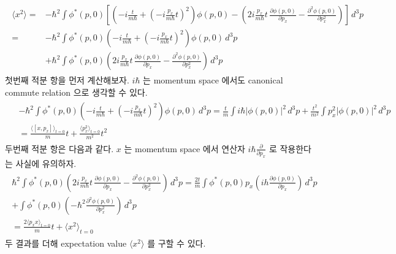 \documentclass[floatfix,nofootinbib,superscriptaddress,fleqn]{revtex4}
\begin{document}
\begin{itemize}
  \begin{align*}
    \begin{split}       
      \langle x^2 \rangle =& -\hbar^2\int\phi^*(p,0)
      \left[\left(-i\frac{t}{m\hbar}
      +\left(-i\frac{p_x}{m\hbar}t \right)^2\right)\phi(p,0)
      -\left(2i\frac{p_x}{m\hbar}t\,\frac{\partial \phi(p,0)}{\partial p_x}
      -\frac{\partial^2 \phi(p,0)}{\partial p_x^2}\right) \right]\,d^3p  \\
      =&-\hbar^2\int\phi^*(p,0)\left(-i\frac{t}{m\hbar}
      +\left(-i\frac{p_x}{m\hbar}t \right)^2\right)\phi(p,0)\,d^3p  \\
      &+\hbar^2\int\phi^*(p,0)\left(2i\frac{p_x}{m\hbar}t\,
      \frac{\partial\phi(p,0)}{\partial p_x}
      -\frac{\partial^2 \phi(p,0)}{\partial p_x^2}\right)\,d^3p 
    \end{split}
  \end{align*}
첫번째 적분 항을 먼저 계산해보자. $i\hbar$ 는 momentum space 
에서도 canonical commute relation 으로 생각할 수 있다.
  \begin{align*}
    \begin{split}
      &-\hbar^2\int\phi^*(p,0)\left(-i\frac{t}{m\hbar}
      +\left(-i\frac{p_x}{m\hbar}t \right)^2\right)\phi(p,0)\,d^3p 
      =\frac{t}{m}\int i\hbar|\phi(p,0)|^2\,d^3p+\frac{t^2}{m^2}
      \int p_x^2|\phi(p,0)|^2\,d^3p \\
      &=\frac{\langle[x,p_x]\rangle_{t=0}}{m}t
      +\frac{\langle p_x^2\rangle_{t=0}}{m^2}t^2
    \end{split}
  \end{align*}
두번째 적분 항은 다음과 같다. 
$x$ 는 momentum space 에서 연산자 $i\hbar\frac{\partial}{\partial p_x}$ 
로 작용한다는 사실에 유의하자.
  \begin{align*}
    \begin{split}
      \hbar^2\int\phi^*(p,0)\left(2i\frac{p_x}{m\hbar}t\,
      \frac{\partial \phi(p,0)}{\partial p_x}
      -\frac{\partial^2 \phi(p,0)}{\partial p_x^2}\right)\,d^3p 
      =\frac{2t}{m}\int\phi^*(p,0)p_x
      \left(ih\frac{\partial\phi(p,0)}{\partial p_x}\right)\,d^3p  \\
      +\int\phi^*(p,0)\left(
        -\hbar^2\frac{\partial^2\phi(p,0)}{\partial p_x^2}\right)\,d^3p  \\
      =\frac{2\langle p_xx\rangle_{t=0}}{m}t+\langle x^2\rangle_{t=0}
    \end{split}
  \end{align*}
두 결과를 더해 expectation value $\langle x^2 \rangle$ 를 구할 수 있다.
  \begin{align}

\end{align}
\end{itemize}
\end{document}
